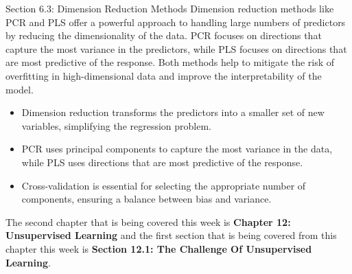 \begin{notes}{Section 6.3: Dimension Reduction Methods}
    Dimension reduction methods like PCR and PLS offer a powerful approach to handling large numbers of predictors by reducing the dimensionality of the data. PCR focuses on directions that capture the most 
    variance in the predictors, while PLS focuses on directions that are most predictive of the response. Both methods help to mitigate the risk of overfitting in high-dimensional data and improve the interpretability 
    of the model.
    
    \begin{highlight}
        \begin{itemize}
            \item Dimension reduction transforms the predictors into a smaller set of new variables, simplifying the regression problem.
            \item PCR uses principal components to capture the most variance in the data, while PLS uses directions that are most predictive of the response.
            \item Cross-validation is essential for selecting the appropriate number of components, ensuring a balance between bias and variance.
        \end{itemize}
    \end{highlight}
\end{notes}

The second chapter that is being covered this week is \textbf{Chapter 12: Unsupervised Learning} and the first section that is being covered from this chapter this week is \textbf{Section 12.1: The Challenge Of Unsupervised Learning}.

